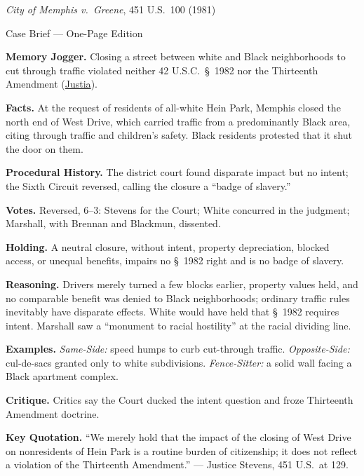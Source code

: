 \documentclass[12pt]{article}
\begin{document}
\begin{center}
{\Large \textit{City of Memphis v.\ Greene}, 451 U.S.\ 100 (1981)\par}
\vspace{0.3em}
{\normalsize Case Brief --- One-Page Edition\par}
\end{center}

\textbf{Memory Jogger.} Closing a street between white and Black neighborhoods to cut through traffic violated neither 42 U.S.C.\ \S~1982 nor the Thirteenth Amendment (\href{https://supreme.justia.com/cases/federal/us/451/100/}{Justia}).

\textbf{Facts.} At the request of residents of all-white Hein Park, Memphis closed the north end of West Drive, which carried traffic from a predominantly Black area, citing through traffic and children's safety. Black residents protested that it shut the door on them.

\textbf{Procedural History.} The district court found disparate impact but no intent; the Sixth Circuit reversed, calling the closure a ``badge of slavery.''

\textbf{Votes.} Reversed, 6--3: Stevens for the Court; White concurred in the judgment; Marshall, with Brennan and Blackmun, dissented.

\textbf{Holding.} A neutral closure, without intent, property depreciation, blocked access, or unequal benefits, impairs no \S~1982 right and is no badge of slavery.

\textbf{Reasoning.} Drivers merely turned a few blocks earlier, property values held, and no comparable benefit was denied to Black neighborhoods; ordinary traffic rules inevitably have disparate effects. White would have held that \S~1982 requires intent. Marshall saw a ``monument to racial hostility'' at the racial dividing line.

\textbf{Examples.} \emph{Same-Side:} speed humps to curb cut-through traffic. \emph{Opposite-Side:} cul-de-sacs granted only to white subdivisions. \emph{Fence-Sitter:} a solid wall facing a Black apartment complex.

\textbf{Critique.} Critics say the Court ducked the intent question and froze Thirteenth Amendment doctrine.

\textbf{Key Quotation.} ``We merely hold that the impact of the closing of West Drive on nonresidents of Hein Park is a routine burden of citizenship; it does not reflect a violation of the Thirteenth Amendment.'' --- Justice Stevens, 451 U.S.\ at 129.
\end{document}
